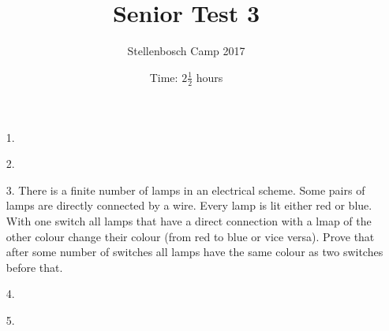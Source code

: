\documentclass[12pt]{article}
\title{Senior Test 3}
\author{Stellenbosch Camp 2017}
\date{Time: $2\frac{1}{2}$ hours}
\begin{document}
 \maketitle

\begin{enumerate}

\item[1.] %


\item[2.] %


\item[3.] %
There is a finite number of lamps in an electrical scheme. Some pairs of lamps are directly connected by a wire. Every lamp is lit either red or blue. With one switch all lamps that have a direct connection with a lmap of the other colour change their colour (from red to blue or vice versa). Prove that after some number of switches all lamps have the same colour as two switches before that.


\item[4.] %


\item[5.] %


\end{enumerate}
\end{document}
